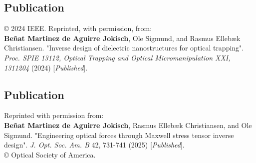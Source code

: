 \newpage

\cleardoublepage
\vspace*{0.4\textheight}
\begin{center}
  \begin{minipage}{0.9\linewidth}
    \section*{Publication \cite{ownpub3}}

    © 2024 IEEE. Reprinted, with permission, from: \\


    \textbf{Beñat Martinez de Aguirre Jokisch}, Ole Sigmund, and Rasmus Ellebæk Christiansen. "Inverse design of dielectric nanostructures for optical trapping". \textit{Proc. SPIE 13112, Optical Trapping and Optical Micromanipulation XXI, 1311204} (2024) [\textit{Published}].
  \end{minipage}
\end{center}
\newpage

\cleardoublepage
\vspace*{0.4\textheight}
\begin{center}
  \begin{minipage}{0.9\linewidth}
    \section*{Publication \cite{ownpub2}}
    Reprinted with permission from:\\ 

    \textbf{Beñat Martinez de Aguirre Jokisch}, Rasmus Ellebæk Christiansen, and Ole Sigmund. "Engineering optical forces through Maxwell stress tensor inverse design".  \textit{J. Opt. Soc. Am. B} 42, 731-741 (2025) [\textit{Published}].\\

    © Optical Society of America.

  \end{minipage}
\end{center}
\newpage

\cleardoublepage
\vspace*{0.4\textheight}
